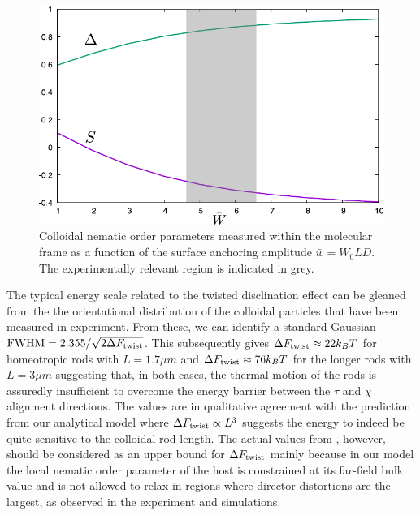 \begin{figure}
	\includegraphics[width = .8\columnwidth]{figures/chapter-3/wwmans}
	\caption[Colloidal nematic order parameters measured within the molecular frame as a function of
the surface anchoring]{ Colloidal nematic order parameters measured within the molecular frame as a function of
the surface anchoring amplitude $\bar{w} = W_{0}LD$. The experimentally relevant region is indicated in grey. }
	\label{ww}
\end{figure}



The typical energy scale related to the twisted disclination effect can be gleaned from the the orientational distribution of the colloidal particles that have been measured in experiment.  From these, we can identify a standard Gaussian ${\rm FWHM} =2.355/\sqrt{2 \Delta F_{\rm twist}}$. This subsequently gives $\Delta F_{\rm twist} \approx 22 k_{B}T$ for homeotropic rods with  $L  = 1.7 \mu m $  and $\Delta F_{\rm twist} \approx 76 k_{B}T$  for the longer rods  with $L  = 3 \mu m $ suggesting that, in both cases, the thermal motion of the rods is assuredly insufficient to overcome the energy barrier between the $\tau$ and $\chi$ alignment directions. The values are in qualitative agreement with the prediction from our analytical model  where $\Delta F_{\rm twist} \propto L^{3}$ suggests the energy to indeed be quite sensitive to the colloidal rod length. The actual values from  , however, should be considered as an upper bound for $\Delta F_{\rm twist}$ mainly because in our model the local nematic order parameter of the host is constrained at its far-field bulk value and is not allowed to relax in regions where director distortions are the largest, as observed in the experiment and simulations. 








